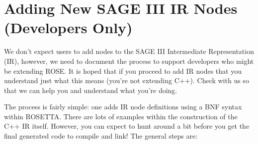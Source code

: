 \section {Adding New SAGE III IR Nodes (Developers Only)}

    We don't expect users to add nodes to the SAGE III Intermediate Representation (IR),
however, we need to document the process to support developers who might be extending
ROSE.  It is hoped that if you proceed to add IR nodes that you understand just
what this means (you're not extending C++). Check with us so that we can help you and
understand what you're doing.

   The process is fairly simple: one adds IR node definitions using a BNF syntax within
ROSETTA.  There are lots of examples within the construction of the C++ IR itself.
However, you can expect to hunt around a bit before you get the final generated code to
compile and link!  The general steps are:



